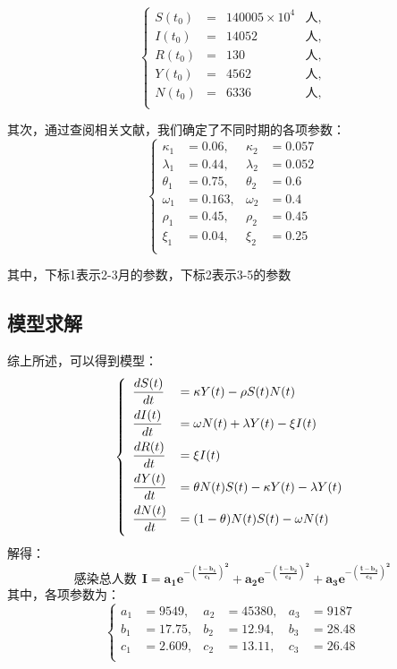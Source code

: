\documentclass[UTF8]{ctexart}
\begin{document}
		\[\left\{\begin{array}{llcl}
		S(t_0)&=&140005\times10^4&\text{人},\\
		I(t_0)&=&14052 &\text{人},\\
		R(t_0)&=&130 &\text{人},\\
		Y(t_0)&=&4562 &\text{人},\\
		N(t_0)&=&6336 &\text{人},\\
		\end{array} \right.\]
		
		其次，通过查阅相关文献，我们确定了不同时期的各项参数：
		\[\left\{\begin{array}{lllll}
		\kappa_{1}&=0.06  ,&\kappa_{2}&=0.057\\
		\lambda_{1}&=0.44 ,&\lambda_{2}&=0.052\\
		\theta_{1}&=0.75  ,&\theta_{2}&=0.6\\
		\omega_{1}&=0.163 ,&\omega_{2}&=0.4\\
		\rho_{1}  &=0.45  ,&\rho_{2}&=0.45\\
		\xi_{1}   &=0.04  ,&\xi_{2}&=0.25\\
		\end{array}\right. \]

其中，下标1表示2-3月的参数，下标2表示3-5的参数		


\vspace{1cm}	
			\subsection{模型求解}
		综上所述，可以得到模型：
		\[\left\{
		\begin{array}{ll}
		\displaystyle\frac{dS(t)}{dt}&=\kappa Y(t)-\rho S(t)N(t)        			 \vspace{1ex} \\
		\displaystyle\frac{dI(t)}{dt}&=\omega N(t)+\lambda Y(t)-\xi I(t) 		\vspace{1ex} \\
		\displaystyle\frac{dR(t)}{dt}&=\xi I(t)                         			 \vspace{1ex} \\
		\displaystyle\frac{dY(t)}{dt}&=\theta N(t)S(t)-\kappa Y(t)-\lambda Y(t)	\vspace{1ex} \\
		\displaystyle\frac{dN(t)}{dt}&=(1-\theta) N(t)S(t)-\omega N(t)			\vspace{1ex} \\
		\end{array}\right.\]\vspace{0.5cm}
		解得：
		\begin{equation}
		\text{感染总人数}\ \  \mathbf{I= a_1e^{-(\frac{t-b_1}{c_1})^2}+a_2e^{-(\frac{t-b_2}{c_2})^2}+a_3e^{-(\frac{t-b_3}{c_3})^2}   }
		\end{equation}\vspace{0.5cm}
		其中，各项参数为：
		\[\left\{\begin{array}{llllll}
		a_{1}&=9549 ,&a_{2}&=45380  ,&a_{3}&=9187\\
		b_{1}&=17.75 ,&b_{2}&=12.94 ,&b_{3}&=28.48\\
		c_{1}&=2.609 ,&c_{2}&=13.11 ,&c_{3}&=26.48\\
		\end{array}\right. \]
		
\end{document}
